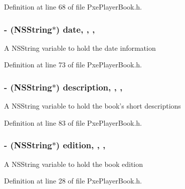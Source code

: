 Definition at line 68 of file Pxe\-Player\-Book.\-h.

\hypertarget{interface_pxe_player_book_ad8a2e06c55f191348773ee7b7e2ca3d9}{
\subsubsection[{date}]{\setlength{\rightskip}{0pt plus 5cm}-\/ (N\-S\-String$\ast$) date\hspace{0.3cm}{\ttfamily [read]}, {\ttfamily [write]}, {\ttfamily [nonatomic]}, {\ttfamily [strong]}}}\label{interface_pxe_player_book_ad8a2e06c55f191348773ee7b7e2ca3d9}
A N\-S\-String variable to hold the date information 

Definition at line 73 of file Pxe\-Player\-Book.\-h.

\hypertarget{interface_pxe_player_book_aa673b642a388b3ebde37ccaf03cc7ad4}{
\subsubsection[{description}]{\setlength{\rightskip}{0pt plus 5cm}-\/ (N\-S\-String$\ast$) description\hspace{0.3cm}{\ttfamily [read]}, {\ttfamily [write]}, {\ttfamily [nonatomic]}, {\ttfamily [strong]}}}\label{interface_pxe_player_book_aa673b642a388b3ebde37ccaf03cc7ad4}
A N\-S\-String variable to hold the book's short descriptions 

Definition at line 83 of file Pxe\-Player\-Book.\-h.

\hypertarget{interface_pxe_player_book_a218bf45943504045b908b7c438b994f0}{
\subsubsection[{edition}]{\setlength{\rightskip}{0pt plus 5cm}-\/ (N\-S\-String$\ast$) edition\hspace{0.3cm}{\ttfamily [read]}, {\ttfamily [write]}, {\ttfamily [nonatomic]}, {\ttfamily [strong]}}}\label{interface_pxe_player_book_a218bf45943504045b908b7c438b994f0}
A N\-S\-String variable to hold the book edition 

Definition at line 28 of file Pxe\-Player\-Book.\-h.

